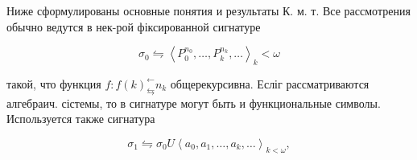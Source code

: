 \documentclass[10pt]{article}
\begin{document}
Ниже сформулированы основные понятия и результаты К. м. т. Все рассмотрения обычно ведутся в нек-рой фіксированной сигнатуре



\[

\sigma_{0} \leftrightharpoons\left\langle P_{0}^{n_{0}}, \ldots, P_{k}^{n_{k}}, \ldots\right\rangle_{k}<\omega

\]



такой, что функция $f: f(k)_{\leftrightarrows}^{\longleftarrow} n_{k}$ общерекурсивна. Есліг рассматриваются алгебраич. сістемы, то в сигнатуре могут быть и функциональные символы. Используется также сигнатура



\[

\sigma_{1} \leftrightharpoons \sigma_{0} U\left\langle a_{0}, a_{1}, \ldots, a_{k}, \ldots\right\rangle_{k<\omega},

\]
\end{document}
